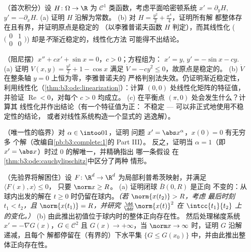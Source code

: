 \begin{exercise}[$\star\star$]\label{exo:b3:ode:7}
（首次积分）设 $H \colon \Omega \to \R$ 为 $\mathcal
C^1$ 类函数，考虑平面哈密顿系统 $x' =
\partial_yH$, $y' = -\partial_xH$.
(a) 证明 $H$ 沿解为常数。
(b) 对 $H = \frac{y^2}2 + \frac{x^4}4$，证明所有解
都整体存在且有界，并证明原点是稳定的
（以李雅普诺夫函数 $H$ 判定），而其线性化
($\bigl(\begin{smallmatrix}0&1\\0&0\end{smallmatrix}\bigr)$)
却是\emph{不}渐近稳定的，线性化方法
可能得不出结论。
\end{exercise}

\begin{exercise}[$\star\star\star$]\label{exo:b3:ode:8}
（阻尼摆）$x'' + cx' + \sin x = 0$，$c > 0$；方程组为：
$x' = y$, $y' = -\sin x - cy$.
(a) 证明 $V(x, y) = \frac{y^2}2 + 1 - \cos x$ 满足 $\dot
V = -cy^2 \leq 0$，故原点是稳定的。
(b) $\dot V$ 在整条轴 $y = 0$ 上恒为零，李雅普诺夫的
严格判别法失效。仍证明渐近稳定性，
利用线性化（\cref{thm:b3:ode:linearization}）：计算
$(0,0)$ 处线性化矩阵的特征值，并验证
$\operatorname{Re} < 0$，对每个 $c > 0$ 均成立。
(c) 在平衡点 $(\pi, 0)$ 处会发生什么？计算其
线性化并作出结论（有一个特征值为正：
不稳定 --- 可以非正式地使用不稳定性的结论，
或者对线性系统构造一个显式的
逃逸解）。
\end{exercise}

\begin{exercise}[$\star\star$]\label{exo:b3:ode:9}
（唯一性的临界）对 $\alpha \in \intoo01$，证明
问题 $x' = \abs x^{\alpha}$，$x(0) = 0$ 有无穷多
个解（改编自\cref{pb:b3:complete:1}的 Part III）。
反之，证明当 $\alpha = 1$（即 $x' = \abs
x$）时过 $0$ 的解唯一，并精确指出
哪一条假设
在\cref{thm:b3:ode:cauchylipschitz}中区分了两种
情形。
\end{exercise}

\begin{exercise}[$\star\star\star$]\label{exo:b3:ode:10}
（先验界将解困住）设 $F \colon \R^d \to \R^d$
为局部利普希茨映射，并满足 $\langle F(x), x\rangle \leq 0$，
只要 $\norm x \geq R$。
(a) 证明闭球 $\bar B(0, R)$ 是正向
不变的：从球内出发的解在 $t \geq
0$ 时仍留在球内。\emph{（若 $\norm{x(t_2)} > R$，考虑
最后时刻 $t_1 < t_2$，且 $\norm{x(t_1)} = R$，并研究
$\frac{\dd}{\dd t}\norm{x(t)}^2$ 在 $\intcc{t_1}{t_2}$ 上的变化。）}
(b) 由此推出初值位于球内时的整体正向存在性。
然后处理梯度系统 $x' = -\nabla G(x)$，$G \in
\mathcal C^2$ 且 $G(x) \to +\infty$，当 $\norm x \to
\infty$ 时，证明 $G$ 沿解递减，且每个
解都停留在（有界的）下水平集 $\{G \leq
G(x_0)\}$ 中，并由此推出整体正向存在性。
\end{exercise}

